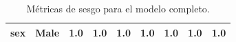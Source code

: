 \documentclass[oneside,openright,titlepage,numbers=noenddot,openany,headinclude,footinclude=true,
cleardoublepage=empty,abstractoff,BCOR=5mm,paper=a4,fontsize=12pt,main=spanish]{scrreprt}
\begin{document}
\begin{table}[h]
{\begin{tabular}{|c|c|c|c|c|c|c|c|c|}
\textbf{sex}                                                      & Male                                                               & {\color[HTML]{3166FF} 1.0}                                       & {\color[HTML]{3166FF} 1.0}                                       & {\color[HTML]{3166FF} 1.0}                                       & {\color[HTML]{3166FF} 1.0}                                       & {\color[HTML]{3166FF} 1.0}                                       & {\color[HTML]{3166FF} 1.0}                                       & {\color[HTML]{3166FF} 1.0}                                       \\ \hline
\end{tabular}
}
\caption{Métricas de sesgo para el modelo completo.}
\label{tab:sesgofull}
\end{table}
\end{document}
